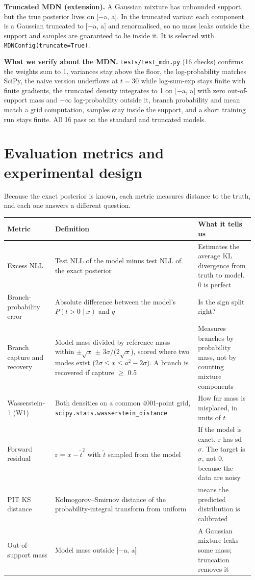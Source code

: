 \documentclass[11pt,a4paper]{article}
\begin{document}
\textbf{Truncated MDN (extension).} A Gaussian mixture has unbounded support, but the true posterior lives on [$-$a, a]. In the truncated variant each component is a Gaussian truncated to [$-$a, a] and renormalised, so no mass leaks outside the support and samples are guaranteed to lie inside it. It is selected with \texttt{MDNConfig(truncate=True)}.

\textbf{What we verify about the MDN.} \texttt{tests/\allowbreak{}test\_\allowbreak{}mdn.py} (16 checks) confirms the weights sum to 1, variances stay above the floor, the log-probability matches SciPy, the naive version underflows at $t = 30$ while log-sum-exp stays finite with finite gradients, the truncated density integrates to 1 on [$-$a, a] with zero out-of-support mass and $-$$\infty$ log-probability outside it, branch probability and mean match a grid computation, samples stay inside the support, and a short training run stays finite. All 16 pass on the standard and truncated models.

\section{Evaluation metrics and experimental design}
Because the exact posterior is known, each metric measures distance to the truth, and each one answers a different question.

\begin{table}[H]
\centering\small
\begin{tabularx}{\linewidth}{l>{\raggedright\arraybackslash}X>{\raggedright\arraybackslash}X}
\toprule
\textbf{Metric} & \textbf{Definition} & \textbf{What it tells us} \\
\midrule
Excess NLL & Test NLL of the model minus test NLL of the exact posterior & Estimates the average KL divergence from truth to model. 0 is perfect \\
Branch-probability error & Absolute difference between the model's $P(t > 0 \mid  x)$ and $q$ & Is the sign split right? \\
Branch capture and recovery & Model mass divided by reference mass within $\pm \sqrt{x}$ $\pm$ $3\sigma$/($2\sqrt{x}$), scored where two modes exist ($2\sigma  \le  x \le  a^{2} - 2\sigma$). A branch is recovered if capture $\ge$ 0.5 & Measures branches by probability mass, not by counting mixture components \\
Wasserstein-1 (W1) & Both densities on a common 4001-point grid, \texttt{scipy.stats.wasserstein\_\allowbreak{}distance} & How far mass is misplaced, in units of $t$ \\
Forward residual & r = $x - \tilde{t}^{2}$ with $\tilde{t}$ sampled from the model & If the model is exact, r has sd $\sigma$. The target is $\sigma$, not 0, because the data are noisy \\
PIT KS distance & Kolmogorov--Smirnov distance of the probability-integral transform from uniform & 0 means the predicted distribution is calibrated \\
Out-of-support mass & Model mass outside [$-$a, a] & A Gaussian mixture leaks some mass; truncation removes it \\
\bottomrule
\end{tabularx}
\end{table}
\end{document}
